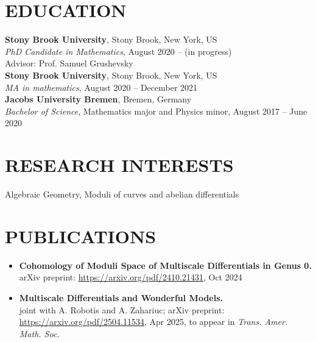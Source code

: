 \documentclass[margin]{res}
\begin{document}

\address{700 Health Sciences Drive\\Chapin-B-1015C\\11790 Stony Brook, New York, US}
\address{prabhat.devkota@stonybrook.edu\\\url{https://p-devkota.github.io}}

\begin{resume}

  \section{EDUCATION}
  \textbf{Stony Brook University}, Stony Brook, New York, US\\
  {\sl PhD Candidate in Mathematics}, August 2020 -- (in progress)\\
  Advisor: Prof. Samuel Grushevsky\\

  \textbf{Stony Brook University}, Stony Brook, New York, US\\
  {\sl MA in mathematics}, August 2020 -- December 2021\\
  
\textbf{Jacobs University Bremen}, Bremen, Germany\\
{\sl Bachelor of Science}, Mathematics major and Physics minor, August 2017 -- June 2020
\\
\section{RESEARCH INTERESTS}
Algebraic Geometry, Moduli of curves and abelian differentials
\\

\section{PUBLICATIONS}
\begin{itemize}
\item \textbf{Cohomology of Moduli Space of Multiscale Differentials in Genus 0.}\\arXiv preprint: \url{https://arxiv.org/pdf/2410.21431}, Oct 2024
\item \textbf{Multiscale Differentials and Wonderful Models.}\\joint with A. Robotis and A. Zahariuc; arXiv preprint: \url{https://arxiv.org/pdf/2504.11534}, Apr 2025, to appear in \em{Trans. Amer. Math. Soc.}
  \end{itemize}


\end{resume}
\end{document}
